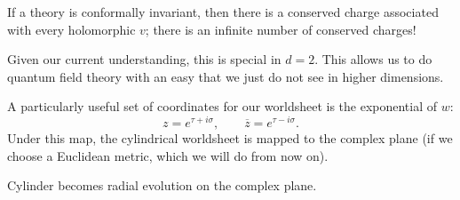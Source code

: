 If a theory is conformally invariant, then there is a conserved charge associated with every holomorphic $v$; there is an infinite number of conserved charges!
\begin{remark}
  Given our current understanding, this is special in $d = 2$.
  This allows us to do quantum field theory with an easy that we just do not see in higher dimensions.
\end{remark}

A particularly useful set of coordinates for our worldsheet is the exponential of $w$:
\begin{equation}
  \label{eq:z}
  z = e^{\tau + i \sigma}, \qquad \overline{z}{} = e^{\tau - i \sigma}.
\end{equation}
Under this map, the cylindrical worldsheet is mapped to the complex plane (if we choose a Euclidean metric, which we will do from now on).

\begin{figure}[tbhp]
  \centering
  \def\svgwidth{0.4\columnwidth}
  
  \caption{}
  \label{fig:l10f1}
\end{figure}

\begin{figure}[tbhp]
  \centering
  \def\svgwidth{0.4\columnwidth}
  
  \caption{}
  \label{fig:l10f2}
\end{figure}

Cylinder becomes radial evolution on the complex plane.

